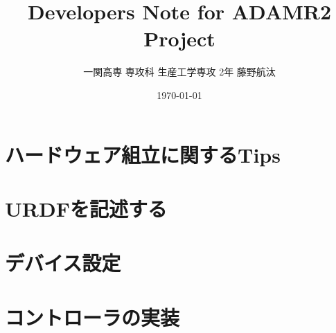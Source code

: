 \documentclass[uplatex, a4paper]{jsreport}
\title{\Huge Developers Note for ADAMR2 Project}
\author{一関高専 専攻科 生産工学専攻 2年 藤野航汰}
\date{\today}
\begin{document}
\maketitle  %

\tableofcontents  %
\newpage

\chapter{ハードウェア組立に関するTips}


\chapter{URDFを記述する}









\chapter{デバイス設定}



\chapter{コントローラの実装}











\end{document}
